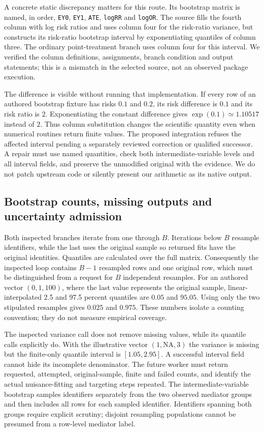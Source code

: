 A concrete static discrepancy matters for this route. Its bootstrap matrix is
named, in order, \texttt{EY0}, \texttt{EY1}, \texttt{ATE}, \texttt{logRR} and
\texttt{logOR}. The source fills the fourth column with log risk ratios and
uses column four for the risk-ratio variance, but constructs its risk-ratio
bootstrap interval by exponentiating quantiles of column three. The ordinary
point-treatment branch uses column four for this interval. We verified the
column definitions, assignments, branch condition and output statements; this
is a mismatch in the selected source, not an observed package execution.
\citep{exec24_tmle_sources}

The difference is visible without running that implementation. If every row of
an authored bootstrap fixture has risks $0.1$ and $0.2$, its risk difference is
$0.1$ and its risk ratio is $2$. Exponentiating the constant difference gives
$\exp(0.1)\simeq1.10517$ instead of $2$. Thus column substitution changes the
scientific quantity even when numerical routines return finite values. The
proposed integration refuses the affected interval pending a separately
reviewed correction or qualified successor. A repair must use named quantities,
check both intermediate-variable levels and all interval fields, and preserve
the unmodified original with the evidence. We do not patch upstream code or
silently present our arithmetic as its native output.
\citep{exec24_tmle_contract}

\subsection{Bootstrap counts, missing outputs and uncertainty admission}
Both inspected branches iterate from one through $B$. Iterations below $B$
resample identifiers, while the last uses the original sample so returned fits
have the original identities. Quantiles are calculated over the full matrix.
Consequently the inspected loop contains $B-1$ resampled rows and one original
row, which must be distinguished from a request for $B$ independent resamples.
For an authored vector $(0,1,100)$, where the last value represents the original
sample, linear-interpolated 2.5 and 97.5 percent quantiles are $0.05$ and $95.05$.
Using only the two stipulated resamples gives $0.025$ and $0.975$. These numbers
isolate a counting convention; they do not measure empirical coverage.
\citep{exec24_tmle_sources,exec24_tmle_contract}

The inspected variance call does not remove missing values, while its quantile
calls explicitly do. With the illustrative vector $(1,\mathrm{NA},3)$ the
variance is missing but the finite-only quantile interval is $[1.05,2.95]$.
A successful interval field cannot hide its incomplete denominator. The future
worker must return requested, attempted, original-sample, finite and failed
counts, and identify the actual nuisance-fitting and targeting steps repeated.
The intermediate-variable bootstrap samples identifiers separately from the two
observed mediator groups and then includes all rows for each sampled identifier.
Identifiers spanning both groups require explicit scrutiny; disjoint resampling
populations cannot be presumed from a row-level mediator label.
\citep{exec24_tmle_sources,exec24_tmle_contract}

